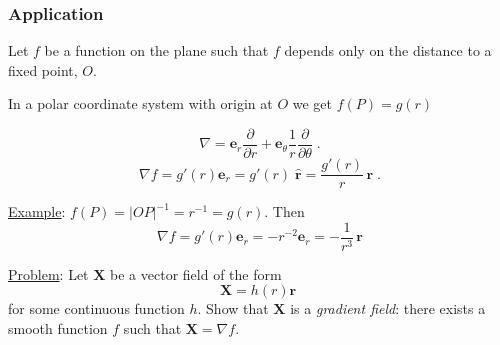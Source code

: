 \begin{frame}
  \frametitle{Application}
  Let $f$ be a function on the plane such that $f$ depends only on the distance to a fixed point, $O$.

\pause
  In a polar coordinate system with origin at $O$ we get $f(P) = g(r)$

  $$\nabla = \textbf{e}_r \frac{\partial }{\partial r} + \textbf{e}_\theta \frac{1}{r} \frac{\partial }{\partial \theta}\; .$$
%
$$\nabla f = g'(r) \textbf{e}_r = g'(r) \; \widehat{\textbf{r}} = \frac{g'(r)}{r}\, \textbf{r}\; .$$

\pause
\underline{Example}: $f(P) = |OP|^{-1}= r^{-1}=g(r)$. Then
%
$$\nabla f = g'(r)\textbf{e}_r = - r^{-2} \textbf{e}_r = -\frac{1}{r^3} \, \textbf{r}$$

\pause
\underline{Problem}: Let $\textbf{X}$ be a vector field of the form
%
$$\textbf{X} = h(r) \textbf{r}\; $$
%
for some continuous function $h$. Show that $\textbf{X}$ is a \emph{gradient field}: there exists a smooth function $f$ such that $\textbf{X} = \nabla f$.
\end{frame}